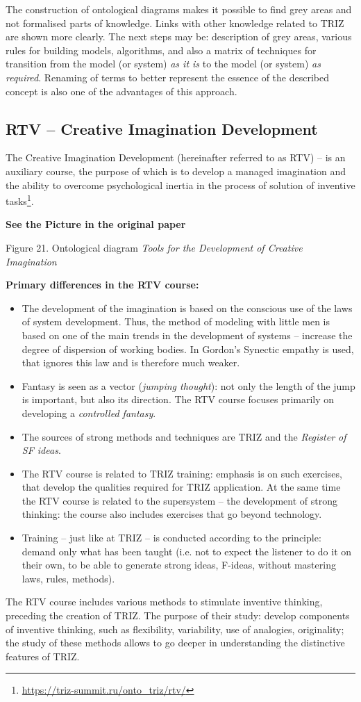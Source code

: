 \documentclass[11pt,a4paper]{article}
\newcommand{\addpicture}{\textbf{See the Picture in the original paper}\par}
\begin{document}
The construction of ontological diagrams makes it possible to find grey areas
and not formalised parts of knowledge. Links with other knowledge related to
TRIZ are shown more clearly. The next steps may be: description of grey areas,
various rules for building models, algorithms, and also a matrix of techniques
for transition from the model (or system) \emph{as it is} to the model (or
system) \emph{as required}.  Renaming of terms to better represent the essence
of the described concept is also one of the advantages of this approach.

\subsection{RTV -- Creative Imagination Development}

The Creative Imagination Development (hereinafter referred to as RTV) -- is an
auxiliary course, the purpose of which is to develop a managed imagination and
the ability to overcome psychological inertia in the process of solution of
inventive tasks\footnote{\url{https://triz-summit.ru/onto_triz/rtv/}}.
\begin{center}
  \addpicture
  Figure 21. Ontological diagram \emph{Tools for the Development of Creative
    Imagination}
\end{center}
\textbf{Primary differences in the RTV course:}
\begin{itemize}
\item[1.] The development of the imagination is based on the conscious use of
  the laws of system development. Thus, the method of modeling with little men
  is based on one of the main trends in the development of systems -- increase
  the degree of dispersion of working bodies. In Gordon's Synectic empathy is
  used, that ignores this law and is therefore much weaker.
\item[2.] Fantasy is seen as a vector (\emph{jumping thought}): not only the
  length of the jump is important, but also its direction. The RTV course
  focuses primarily on developing a \emph{controlled fantasy}.
\item[3.] The sources of strong methods and techniques are TRIZ and the
  \emph{Register of SF ideas}.
\item[4.] The RTV course is related to TRIZ training: emphasis is on such
  exercises, that develop the qualities required for TRIZ application. At the
  same time the RTV course is related to the supersystem -- the development of
  strong thinking: the course also includes exercises that go beyond
  technology.
\item[5.] Training -- just like at TRIZ -- is conducted according to the
  principle: demand only what has been taught (i.e. not to expect the listener
  to do it on their own, to be able to generate strong ideas, F-ideas, without
  mastering laws, rules, methods).
\end{itemize}
The RTV course includes various methods to stimulate inventive thinking,
preceding the creation of TRIZ. The purpose of their study: develop components
of inventive thinking, such as flexibility, variability, use of analogies,
originality; the study of these methods allows to go deeper in understanding
the distinctive features of TRIZ.
\end{document}
